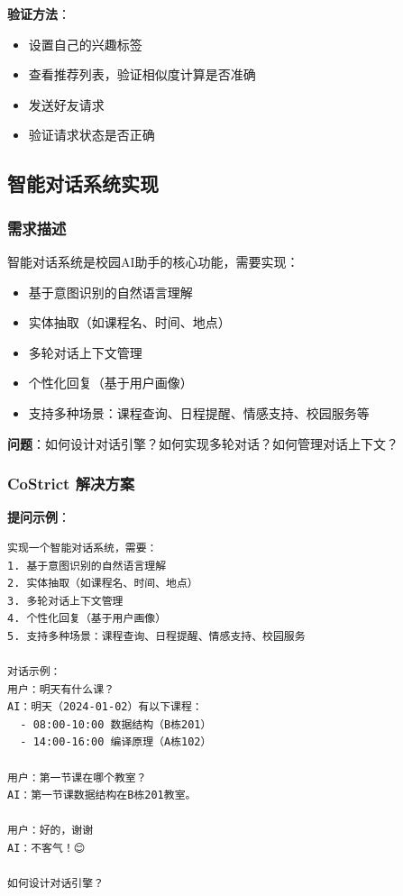 \documentclass[12pt,a4paper]{article}
\begin{document}
\textbf{验证方法}：
\begin{itemize}
    \item 设置自己的兴趣标签
    \item 查看推荐列表，验证相似度计算是否准确
    \item 发送好友请求
    \item 验证请求状态是否正确
\end{itemize}

\subsection{智能对话系统实现}

\subsubsection{需求描述}

智能对话系统是校园AI助手的核心功能，需要实现：
\begin{itemize}
    \item 基于意图识别的自然语言理解
    \item 实体抽取（如课程名、时间、地点）
    \item 多轮对话上下文管理
    \item 个性化回复（基于用户画像）
    \item 支持多种场景：课程查询、日程提醒、情感支持、校园服务等
\end{itemize}

\textbf{问题}：如何设计对话引擎？如何实现多轮对话？如何管理对话上下文？

\subsubsection{CoStrict 解决方案}

\textbf{提问示例}：
\begin{verbatim}
实现一个智能对话系统，需要：
1. 基于意图识别的自然语言理解
2. 实体抽取（如课程名、时间、地点）
3. 多轮对话上下文管理
4. 个性化回复（基于用户画像）
5. 支持多种场景：课程查询、日程提醒、情感支持、校园服务

对话示例：
用户：明天有什么课？
AI：明天（2024-01-02）有以下课程：
  - 08:00-10:00 数据结构（B栋201）
  - 14:00-16:00 编译原理（A栋102）

用户：第一节课在哪个教室？
AI：第一节课数据结构在B栋201教室。

用户：好的，谢谢
AI：不客气！😊

如何设计对话引擎？
\end{verbatim}
\end{document}
